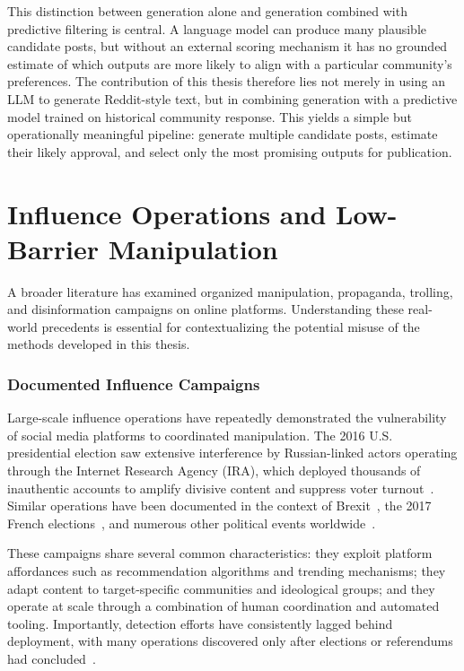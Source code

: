 This distinction between generation alone and generation combined with predictive filtering is central. A language model can produce many plausible candidate posts, but without an external scoring mechanism it has no grounded estimate of which outputs are more likely to align with a particular community's preferences. The contribution of this thesis therefore lies not merely in using an LLM to generate Reddit-style text, but in combining generation with a predictive model trained on historical community response. This yields a simple but operationally meaningful pipeline: generate multiple candidate posts, estimate their likely approval, and select only the most promising outputs for publication.

\section{Influence Operations and Low-Barrier Manipulation}
\label{sec:influence_ops}

A broader literature has examined organized manipulation, propaganda, trolling, and disinformation campaigns on online platforms. Understanding these real-world precedents is essential for contextualizing the potential misuse of the methods developed in this thesis.

\subsubsection*{Documented Influence Campaigns}

Large-scale influence operations have repeatedly demonstrated the vulnerability of social media platforms to coordinated manipulation. The 2016 U.S. presidential election saw extensive interference by Russian-linked actors operating through the Internet Research Agency (IRA), which deployed thousands of inauthentic accounts to amplify divisive content and suppress voter turnout~\cite{badawy2018analyzing,zannettou2019disinformation}. Similar operations have been documented in the context of Brexit~\cite{bastos2019brexit}, the 2017 French elections~\cite{DBLP:journals/corr/Ferrara17aa}, and numerous other political events worldwide~\cite{woolley2018computational}.

These campaigns share several common characteristics: they exploit platform affordances such as recommendation algorithms and trending mechanisms; they adapt content to target-specific communities and ideological groups; and they operate at scale through a combination of human coordination and automated tooling. Importantly, detection efforts have consistently lagged behind deployment, with many operations discovered only after elections or referendums had concluded~\cite{shao2018spread}.

